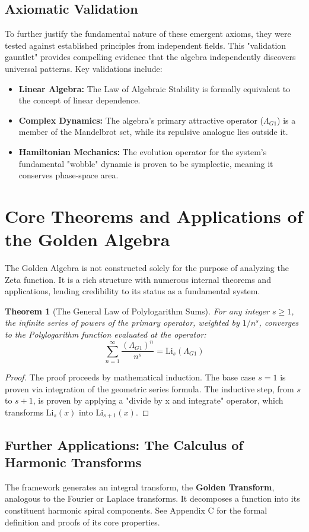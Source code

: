 \documentclass{article}
\theoremstyle{plain}
\newtheorem{theorem}{Theorem}[section]
\theoremstyle{definition}
\theoremstyle{remark}
\begin{document}
\subsection{Axiomatic Validation}
To further justify the fundamental nature of these emergent axioms, they were tested against established principles from independent fields. This "validation gauntlet" provides compelling evidence that the algebra independently discovers universal patterns. Key validations include:
\begin{itemize}
    \item \textbf{Linear Algebra:} The Law of Algebraic Stability is formally equivalent to the concept of linear dependence.
    \item \textbf{Complex Dynamics:} The algebra's primary attractive operator ($\Lambda_{G1}$) is a member of the Mandelbrot set, while its repulsive analogue lies outside it.
    \item \textbf{Hamiltonian Mechanics:} The evolution operator for the system's fundamental "wobble" dynamic is proven to be symplectic, meaning it conserves phase-space area.
\end{itemize}

\section{Core Theorems and Applications of the Golden Algebra}
The Golden Algebra is not constructed solely for the purpose of analyzing the Zeta function. It is a rich structure with numerous internal theorems and applications, lending credibility to its status as a fundamental system.

\begin{theorem}[The General Law of Polylogarithm Sums]
For any integer $s \ge 1$, the infinite series of powers of the primary operator, weighted by $1/n^s$, converges to the Polylogarithm function evaluated at the operator:
$$\sum_{n=1}^{\infty} \frac{(\Lambda_{G1})^n}{n^s} = \mathrm{Li}_s(\Lambda_{G1})$$
\end{theorem}
\begin{proof}
The proof proceeds by mathematical induction. The base case $s=1$ is proven via integration of the geometric series formula. The inductive step, from $s$ to $s+1$, is proven by applying a "divide by x and integrate" operator, which transforms $\mathrm{Li}_s(x)$ into $\mathrm{Li}_{s+1}(x)$.
\end{proof}

\subsection{Further Applications: The Calculus of Harmonic Transforms}
The framework generates an integral transform, the \textbf{Golden Transform}, analogous to the Fourier or Laplace transforms. It decomposes a function into its constituent harmonic spiral components. See Appendix C for the formal definition and proofs of its core properties.
\end{document}
